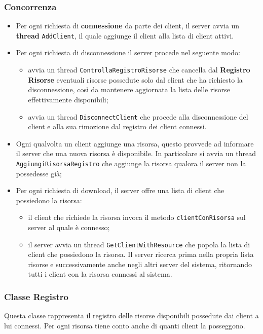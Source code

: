 \documentclass[10pt]{article}
\begin{document}
\subsubsection{Concorrenza}
\begin{itemize}
\item Per ogni richiesta di \textbf{connessione} da parte dei client, il server avvia un \textbf{thread} {\verb!AddClient!}, il quale aggiunge il client alla lista di client attivi.
\item Per ogni richiesta di disconnessione il server procede nel seguente modo:
	\begin{itemize}
		\item avvia un thread {\verb!ControllaRegistroRisorse!} che cancella dal \textbf{Registro Risorse} eventuali risorse possedute solo dal client che ha richiesto la disconnessione, così da mantenere aggiornata la lista delle risorse effettivamente disponibili;
		\item avvia un thread {\verb!DisconnectClient!} che procede alla disconnessione del client e alla sua rimozione dal registro dei client connessi.
	\end{itemize}
\item Ogni qualvolta un client aggiunge una risorsa, questo provvede ad informare il server che una nuova risorsa è disponibile. In particolare si avvia un thread {\verb!AggiungiRisorsaRegistro!} che aggiunge la risorsa qualora il server non la possedesse già;

\item Per ogni richiesta di download, il server offre una lista di client che possiedono la risorsa:
	\begin{itemize}
	 	\item il client che richiede la risorsa invoca il metodo {\verb!clientConRisorsa!} sul server al quale è connesso;
	 	\item il server avvia un thread {\verb!GetClientWithResource!} che popola la lista di client che possiedono la risorsa. Il server ricerca prima nella propria lista risorse e successivamente anche negli altri server del sistema, ritornando tutti i client con la risorsa connessi al sistema.
	\end{itemize}
\end{itemize}

\subsubsection{Classe Registro}
Questa classe rappresenta il registro delle risorse disponibili possedute dai client a lui connessi. Per ogni risorsa tiene conto anche di quanti client la posseggono.
\end{document}
